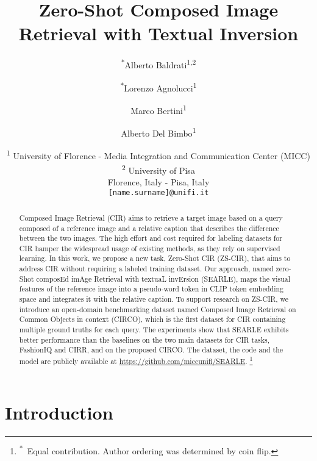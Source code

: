 \documentclass[10pt,twocolumn,letterpaper]{article}
\newcommand{\method}{SEARLE\xspace}
\newcommand\blfootnote[1]{\begingroup
  \renewcommand\thefootnote{}\footnote{#1}\addtocounter{footnote}{-1}\endgroup
}
\begin{document}
\title{Zero-Shot Composed Image Retrieval with Textual Inversion}

\author{\textsuperscript{$*$}Alberto Baldrati\textsuperscript{1,2} \and \textsuperscript{$*$}Lorenzo Agnolucci\textsuperscript{1} \and  Marco Bertini\textsuperscript{1} \and Alberto Del Bimbo\textsuperscript{1} \and
\textsuperscript{1} University of Florence - Media Integration and Communication Center (MICC) \\  \textsuperscript{2} University of Pisa \\ 
Florence, Italy - Pisa, Italy\\
{\tt\small [name.surname]@unifi.it}
}

\maketitle


\begin{abstract}
Composed Image Retrieval (CIR) aims to retrieve a target image based on a query composed of a reference image and a relative caption that describes the difference between the two images. The high effort and cost required for labeling datasets for CIR hamper the widespread usage of existing methods, as they rely on supervised learning. In this work, we propose a new task, Zero-Shot CIR (ZS-CIR), that aims to address CIR without requiring a labeled training dataset. Our approach, named zero-Shot composEd imAge Retrieval with textuaL invErsion (\method), maps the visual features of the reference image into a pseudo-word token in CLIP token embedding space and integrates it with the relative caption. To support research on ZS-CIR, we introduce an open-domain benchmarking dataset named Composed Image Retrieval on Common Objects in context (CIRCO), which is the first dataset for CIR containing multiple ground truths for each query. The experiments show that \method exhibits better performance than the baselines on the two main datasets for CIR tasks, FashionIQ and CIRR, and on the proposed CIRCO. The dataset, the code and the model are publicly available at \small{\href{https://github.com/miccunifi/SEARLE}{\url{https://github.com/miccunifi/SEARLE}}}. \blfootnote{\textsuperscript{$*$}~Equal contribution. Author ordering was determined by coin flip.} 
\end{abstract}

\section{Introduction}
\end{document}
